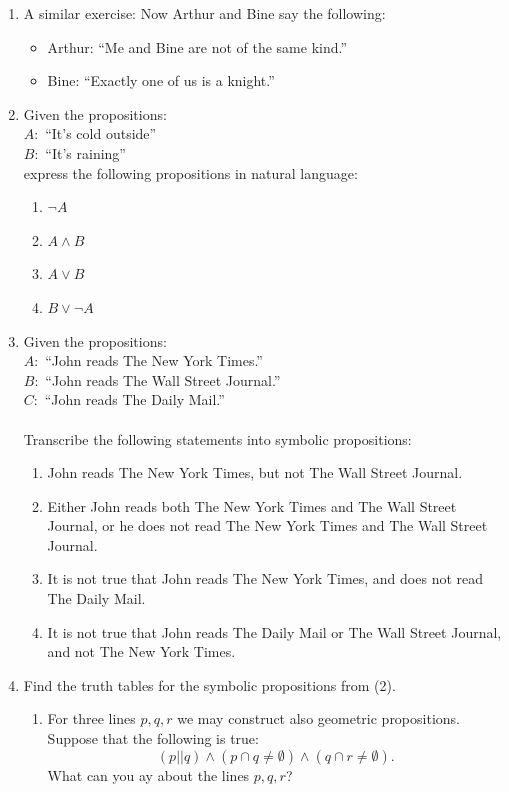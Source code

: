 \documentclass[11pt,paper=b5,footinclude,headinclude]{scrbook} %
\theoremstyle{remark}
\theoremstyle{definition} %
\theoremstyle{theorem} %
\begin{document}
\begin{enumerate}
\item {A similar exercise:}
Now Arthur and Bine say the following:
\begin{itemize}
 \item Arthur: ``Me and Bine are not of the same kind.''
 \item Bine: ``Exactly one of us is a knight.''
\end{itemize}
\item Given the propositions:\\
$A:$ ``It's cold outside''\\
$B:$ ``It's raining''\\
express the following propositions in natural language:
\begin{enumerate}
\item $\neg A$
\item $A\wedge B$
\item $A\vee B$
\item $B\vee\neg A$
\end{enumerate}
\item Given the propositions:\\
$A:$ ``John reads The New York Times.''\\
$B:$ ``John reads The Wall Street Journal.''\\
$C:$ ``John reads The Daily Mail.''\\
\\
Transcribe the following statements into symbolic propositions:
\begin{enumerate}
\item John reads The New York Times, but not The Wall Street Journal.
\item Either John reads both The New York Times and The Wall Street Journal,
or he does not read The New York Times and The Wall Street Journal.
\item It is not true that John reads The New York Times, and does not read
The Daily Mail.
\item It is not true that John reads The Daily Mail or The Wall Street Journal,
and not The New York Times.
\end{enumerate}
\item Find the truth tables for the symbolic propositions from (2).
\begin{enumerate}
\item For three lines $p,q,r$ we may construct also geometric propositions.
Suppose that the following is true:
\[
(p||q)\wedge(p\cap q\neq\emptyset)\wedge(q\cap r\neq\emptyset).
\]
What can you ay about the lines $p,q,r$?

\end{enumerate}
\end{enumerate}
\end{document}

